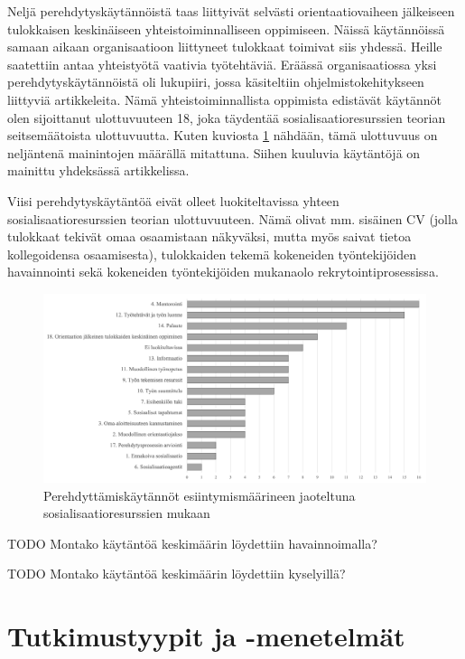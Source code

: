 \documentclass[utf8]{gradu3}
\begin{document}
Neljä perehdytyskäytännöistä taas liittyivät selvästi orientaatiovaiheen jälkeiseen tulokkaisen keskinäiseen yhteistoiminnalliseen oppimiseen. Näissä käytännöissä samaan aikaan organisaatioon liittyneet tulokkaat toimivat siis yhdessä. Heille saatettiin antaa yhteistyötä vaativia työtehtäviä. Eräässä organisaatiossa yksi perehdytyskäytännöistä oli lukupiiri, jossa käsiteltiin ohjelmistokehitykseen liittyviä artikkeleita. Nämä yhteistoiminnallista oppimista edistävät käytännöt olen sijoittanut ulottuvuuteen 18, joka täydentää sosialisaatioresurssien teorian seitsemäätoista ulottuvuutta. Kuten kuviosta \ref{kuvio:ulottuvuudet} nähdään, tämä ulottuvuus on neljäntenä mainintojen määrällä mitattuna. Siihen kuuluvia käytäntöjä on mainittu yhdeksässä artikkelissa. 

Viisi perehdytyskäytäntöä eivät olleet luokiteltavissa yhteen sosialisaatioresurssien teorian ulottuvuuteen. Nämä olivat mm. sisäinen CV (jolla tulokkaat tekivät omaa osaamistaan näkyväksi, mutta myös saivat tietoa kollegoidensa osaamisesta), tulokkaiden tekemä kokeneiden työntekijöiden havainnointi sekä kokeneiden työntekijöiden mukanaolo rekrytointiprosessissa. 

\begin{figure}[h]
    \centering
    \includegraphics[width=\textwidth]{media/ulottuvuudet.png}
    \caption{Perehdyttämiskäytännöt esiintymismäärineen jaoteltuna sosialisaatioresurssien \parencite{saks-gruman-2012} mukaan}
    \label{kuvio:ulottuvuudet}
\end{figure}

TODO Montako käytäntöä keskimäärin löydettiin havainnoimalla?

TODO Montako käytäntöä keskimäärin löydettiin kyselyillä?


\section{Tutkimustyypit ja -menetelmät}
\label{luku-tutkimustyypit-ja-menetelmat}
\end{document}
